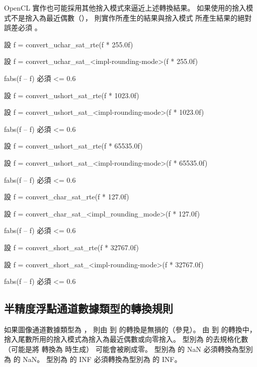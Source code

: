 OpenCL 實作也可能採用其他捨入模式來逼近上述轉換結果。
如果使用的捨入模式不是捨入為最近偶數（），
則實作所產生的結果與捨入模式  所產生結果的絕對誤差必須 。

設 f = convert_uchar_sat_rte(f * 255.0f)

設 f = convert_uchar_sat_<impl-rounding-mode>(f * 255.0f)

fabs(f – f) 必須 <= 0.6
\stopclCmmDesc

設 f = convert_ushort_sat_rte(f * 1023.0f)

設 f = convert_ushort_sat_<impl-rounding-mode>(f * 1023.0f)

fabs(f – f) 必須 <= 0.6
\stopclCmmDesc

設 f = convert_ushort_sat_rte(f * 65535.0f)

設 f = convert_ushort_sat_<impl-rounding-mode>(f * 65535.0f)

fabs(f – f) 必須 <= 0.6
\stopclCmmDesc

設 f = convert_char_sat_rte(f * 127.0f)

設 f = convert_char_sat_<impl_rounding_mode>(f * 127.0f)

fabs(f – f) 必須 <= 0.6
\stopclCmmDesc

設 f = convert_short_sat_rte(f * 32767.0f)

設 f = convert_short_sat_<impl-rounding-mode>(f * 32767.0f)

fabs(f – f) 必須 <= 0.6
\stopclCmmDesc

\subsection{半精度浮點通道數據類型的轉換規則}

如果圖像通道數據類型為 ，
則由  到  的轉換是無損的（參見）。
由  到  的轉換中，
捨入尾數所用的捨入模式為捨入為最近偶數或向零捨入。
型別為  的去規格化數（可能是將  轉換為  時生成）
可能會被刷成零。
型別為  的 NaN 必須轉換為型別為  的 NaN。
型別為  的 INF 必須轉換為型別為  的 INF。


